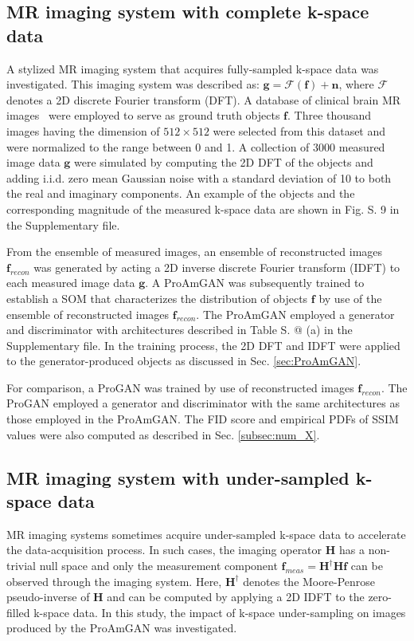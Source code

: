 \documentclass[journal]{IEEEtran}
\makeatletter
\renewcommand{\vec}[1]{\mathbf{#1}}
\newcommand*{\rom}[1]{\expandafter\@slowromancap\romannumeral #1@}
\makeatother
\begin{document}
\subsection{MR imaging system with complete k-space data}
\label{ssec:MR-full-k-space}
A stylized MR imaging system that acquires fully-sampled k-space data was investigated. 
This imaging system was described as: $\vec{g} = \mathcal{F}(\vec{f}) + \vec{n}$, 
where $\mathcal{F}$ denotes a 2D discrete Fourier transform (DFT).
A database of clinical brain MR images~\cite{brain_mri} were employed to serve as ground truth objects $\vec{f}$. Three thousand images having the dimension of $512\times 512$ were selected from this dataset and were normalized to the range between 0 and 1. A collection of 3000 measured image data $\vec{g}$ were simulated by computing the 2D DFT of the objects and adding i.i.d. zero mean Gaussian noise 
with a standard deviation of 10 to both the real and imaginary components.
An example of the objects and the corresponding magnitude of the measured k-space data are shown in Fig. S. 9 in the Supplementary file.


From the ensemble of measured images, 
an ensemble of reconstructed images  $\vec{f}_{recon}$ was generated by
acting a 2D inverse discrete Fourier transform (IDFT) to each measured image data $\vec{g}$.
A ProAmGAN was subsequently trained to establish a SOM that characterizes the distribution of objects $\vec{f}$ 
by use of the ensemble of reconstructed images $\vec{f}_{recon}$. 
 The ProAmGAN employed a generator and discriminator with architectures described in Table S. \rom{1} (a) in the Supplementary file. 
 In the training process, the 2D DFT and IDFT were applied to the generator-produced objects as discussed in Sec. \ref{sec:ProAmGAN}.

 
{For comparison, a ProGAN was trained by use of reconstructed images $\vec{f}_{recon}$.
 The ProGAN employed a generator and discriminator with the same architectures as those employed in the ProAmGAN.
The FID score and empirical PDFs of SSIM values were also computed as described in Sec. \ref{subsec:num_X}.}

 

\subsection{MR imaging system with under-sampled k-space data} 
\label{ssec:MR_sampling}


MR imaging systems sometimes acquire under-sampled k-space data to accelerate the data-acquisition process.
In such cases, the imaging operator $\mathbf{H}$ has a non-trivial null space 
and only the measurement component $\vec{f}_{meas} = \mathbf{H}^{\dagger}\mathbf{H}\vec{f}$
can be observed through the imaging system.
Here, $\mathbf{H}^{\dagger}$ denotes the Moore-Penrose pseudo-inverse of $\mathbf{H}$ and can be computed by applying 
a 2D IDFT to the zero-filled k-space data.
In this study, the impact of k-space under-sampling on images produced by the ProAmGAN was investigated.
\end{document}
